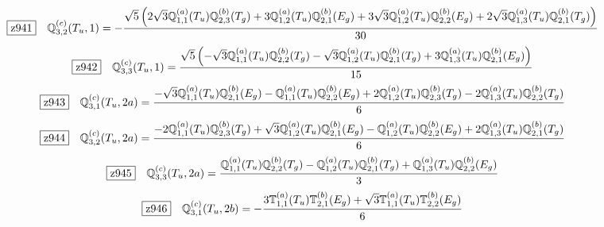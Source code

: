 \documentclass[fleqn,10pt,landscape]{jsarticle}
\begin{document}
\begin{dmath*}
\hspace*{3mm}\fbox{z941}\quad \mathbb{Q}_{3,2}^{(c)}(T_{u},1)=- \frac{\sqrt{5} \left(2 \sqrt{3} \mathbb{Q}_{1,1}^{(a)}(T_{u}) \mathbb{Q}_{2,3}^{(b)}(T_{g}) + 3 \mathbb{Q}_{1,2}^{(a)}(T_{u}) \mathbb{Q}_{2,1}^{(b)}(E_{g}) + 3 \sqrt{3} \mathbb{Q}_{1,2}^{(a)}(T_{u}) \mathbb{Q}_{2,2}^{(b)}(E_{g}) + 2 \sqrt{3} \mathbb{Q}_{1,3}^{(a)}(T_{u}) \mathbb{Q}_{2,1}^{(b)}(T_{g})\right)}{30}
\end{dmath*}
\begin{dmath*}
\hspace*{3mm}\fbox{z942}\quad \mathbb{Q}_{3,3}^{(c)}(T_{u},1)=\frac{\sqrt{5} \left(- \sqrt{3} \mathbb{Q}_{1,1}^{(a)}(T_{u}) \mathbb{Q}_{2,2}^{(b)}(T_{g}) - \sqrt{3} \mathbb{Q}_{1,2}^{(a)}(T_{u}) \mathbb{Q}_{2,1}^{(b)}(T_{g}) + 3 \mathbb{Q}_{1,3}^{(a)}(T_{u}) \mathbb{Q}_{2,1}^{(b)}(E_{g})\right)}{15}
\end{dmath*}
\begin{dmath*}
\hspace*{3mm}\fbox{z943}\quad \mathbb{Q}_{3,1}^{(c)}(T_{u},2a)=\frac{- \sqrt{3} \mathbb{Q}_{1,1}^{(a)}(T_{u}) \mathbb{Q}_{2,1}^{(b)}(E_{g}) - \mathbb{Q}_{1,1}^{(a)}(T_{u}) \mathbb{Q}_{2,2}^{(b)}(E_{g}) + 2 \mathbb{Q}_{1,2}^{(a)}(T_{u}) \mathbb{Q}_{2,3}^{(b)}(T_{g}) - 2 \mathbb{Q}_{1,3}^{(a)}(T_{u}) \mathbb{Q}_{2,2}^{(b)}(T_{g})}{6}
\end{dmath*}
\begin{dmath*}
\hspace*{3mm}\fbox{z944}\quad \mathbb{Q}_{3,2}^{(c)}(T_{u},2a)=\frac{- 2 \mathbb{Q}_{1,1}^{(a)}(T_{u}) \mathbb{Q}_{2,3}^{(b)}(T_{g}) + \sqrt{3} \mathbb{Q}_{1,2}^{(a)}(T_{u}) \mathbb{Q}_{2,1}^{(b)}(E_{g}) - \mathbb{Q}_{1,2}^{(a)}(T_{u}) \mathbb{Q}_{2,2}^{(b)}(E_{g}) + 2 \mathbb{Q}_{1,3}^{(a)}(T_{u}) \mathbb{Q}_{2,1}^{(b)}(T_{g})}{6}
\end{dmath*}
\begin{dmath*}
\hspace*{3mm}\fbox{z945}\quad \mathbb{Q}_{3,3}^{(c)}(T_{u},2a)=\frac{\mathbb{Q}_{1,1}^{(a)}(T_{u}) \mathbb{Q}_{2,2}^{(b)}(T_{g}) - \mathbb{Q}_{1,2}^{(a)}(T_{u}) \mathbb{Q}_{2,1}^{(b)}(T_{g}) + \mathbb{Q}_{1,3}^{(a)}(T_{u}) \mathbb{Q}_{2,2}^{(b)}(E_{g})}{3}
\end{dmath*}
\begin{dmath*}
\hspace*{3mm}\fbox{z946}\quad \mathbb{Q}_{3,1}^{(c)}(T_{u},2b)=- \frac{3 \mathbb{T}_{1,1}^{(a)}(T_{u}) \mathbb{T}_{2,1}^{(b)}(E_{g}) + \sqrt{3} \mathbb{T}_{1,1}^{(a)}(T_{u}) \mathbb{T}_{2,2}^{(b)}(E_{g})}{6}
\end{dmath*}
\end{document}
